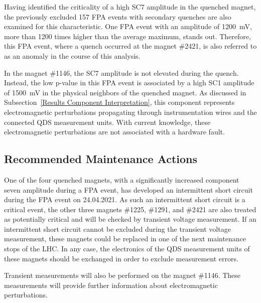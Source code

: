 \documentclass[lettersize,journal]{IEEEtran}
\begin{document}
Having identified the criticality of a high SC7 amplitude in the quenched magnet, the previously excluded 157 FPA events with secondary quenches are also examined for this characteristic. 
One FPA event with an amplitude of 1200~mV, more than 1200 times higher than the average maximum, stands out.
Therefore, this FPA event, where a quench occurred at the magnet \#2421, is also referred to as an anomaly in the course of this analysis.

In the magnet \#1146, the SC7 amplitude is not elevated during the quench.
Instead, the low p-value in this FPA event is associated by a high SC1 amplitude of 1500~mV in the physical neighbors of the quenched magnet.
As discussed in Subsection~\ref{Results Component Interpretation}, this component represents electromagnetic perturbations propagating through instrumentation wires and the connected QDS measurement units.
With current knowledge, these electromagnetic perturbations are not associated with a hardware fault.

\subsection{Recommended Maintenance Actions}\label{Discussion}
One of the four quenched magnets, with a significantly increased component seven amplitude during a FPA event, has developed an intermittent short circuit during the FPA event on 24.04.2021. 
As such an intermittent short circuit is a critical event, the other three magnets \#1225, \#1291, and \#2421 are also treated as potentially critical and will be checked by transient voltage measurement.
If an intermittent short circuit cannot be excluded during the transient voltage measurement, these magnets could be replaced in one of the next maintenance stops of the LHC.
In any case, the electronics of the QDS measurement units of these magnets should be exchanged in order to exclude measurement errors.

Transient measurements will also be performed on the magnet \#1146. 
These measurements will provide further information about electromagnetic perturbations.
\end{document}
